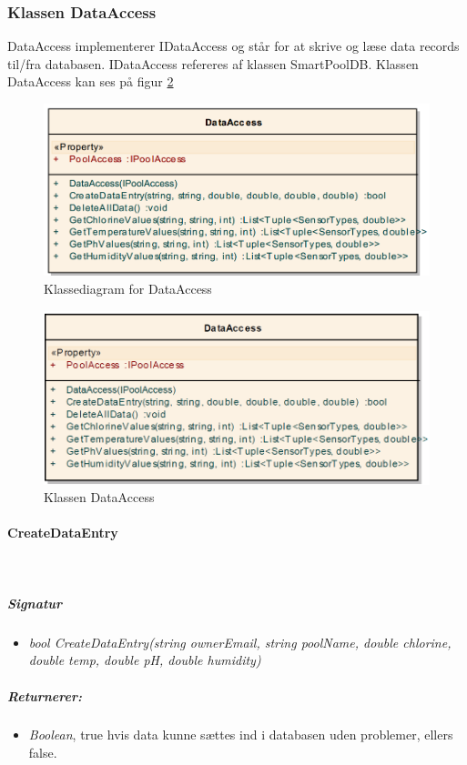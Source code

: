 \subsubsection{Klassen DataAccess}
DataAccess implementerer IDataAccess og står for at skrive og læse data records til/fra databasen.
IDataAccess refereres af klassen SmartPoolDB. Klassen DataAccess kan ses på figur \ref{fig:dataAccessClassNoInherit}

\begin{figure}[H]
\centering
\includegraphics[width=0.7\linewidth]{figs/dbExtra/classdiadata.png}
\caption{Klassediagram for DataAccess}
\label{fig:classdiadata}
\end{figure}


\begin{figure}[h]
\centering
\includegraphics[width=0.7\linewidth]{figs/implementering/dataAccessClassNoInherit}
\caption{Klassen DataAccess}
\label{fig:dataAccessClassNoInherit}
\end{figure}

\paragraph{CreateDataEntry}\ %

\subparagraph{Signatur}
\begin{itemize}
	\item \textit{bool CreateDataEntry(string ownerEmail, string poolName, double chlorine, double temp, double pH, double humidity)}
\end{itemize}

\subparagraph{Returnerer:}
\begin{itemize}
	\item \textit{Boolean}, true hvis data kunne sættes ind i databasen uden problemer, ellers false.
\end{itemize}

